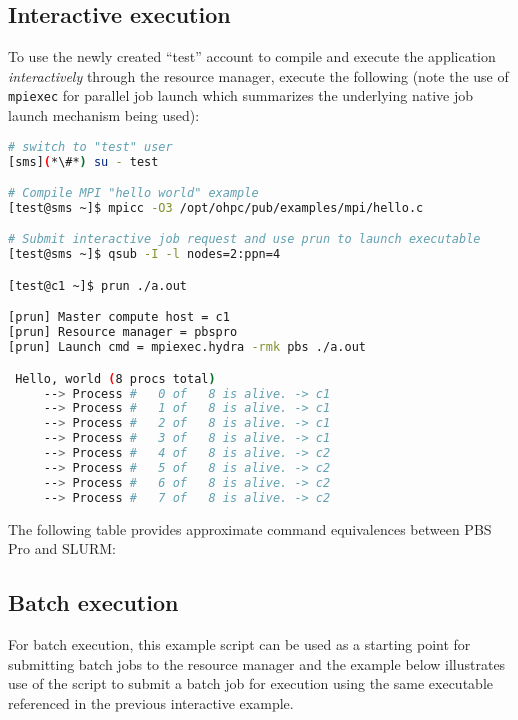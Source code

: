 \subsection{Interactive execution}
To use the newly created ``test'' account to compile and execute the
application {\em interactively} through the resource manager, execute the
following (note the use of \texttt{mpiexec} for parallel job launch which summarizes
the underlying native job launch mechanism being used):

\begin{lstlisting}[language=bash,keywords={}]
# switch to "test" user
[sms](*\#*) su - test

# Compile MPI "hello world" example
[test@sms ~]$ mpicc -O3 /opt/ohpc/pub/examples/mpi/hello.c

# Submit interactive job request and use prun to launch executable
[test@sms ~]$ qsub -I -l nodes=2:ppn=4

[test@c1 ~]$ prun ./a.out

[prun] Master compute host = c1
[prun] Resource manager = pbspro
[prun] Launch cmd = mpiexec.hydra -rmk pbs ./a.out

 Hello, world (8 procs total)
     --> Process #   0 of   8 is alive. -> c1
     --> Process #   1 of   8 is alive. -> c1
     --> Process #   2 of   8 is alive. -> c1
     --> Process #   3 of   8 is alive. -> c1
     --> Process #   4 of   8 is alive. -> c2
     --> Process #   5 of   8 is alive. -> c2
     --> Process #   6 of   8 is alive. -> c2
     --> Process #   7 of   8 is alive. -> c2
\end{lstlisting}


\begin{center}
\begin{tcolorbox}[]
The following table provides approximate command equivalences between PBS Pro
and SLURM:

\vspace*{0.15cm}

\end{tcolorbox}
\end{center}

\subsection{Batch execution}

For batch execution, this example script can be used as a starting point for 
submitting batch jobs to the resource manager and the example below illustrates
use of the script to submit a batch job for execution using the same executable 
referenced in the previous interactive example.

